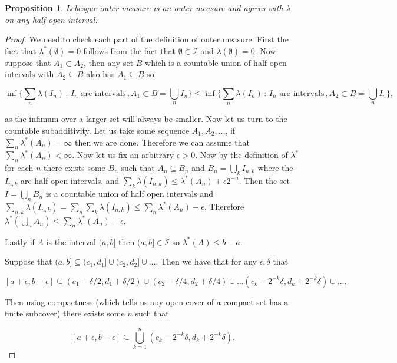\documentclass[
]{book}
\newtheorem{proposition}{Proposition}[chapter]
\theoremstyle{definition}
\theoremstyle{definition}
\theoremstyle{definition}
\theoremstyle{definition}
\theoremstyle{remark}
\begin{document}
\begin{proposition}
Lebesgue outer measure is an outer measure and agrees with \(\lambda\) on any half open interval.
\end{proposition}

\begin{proof}
We need to check each part of the definition of outer measure. First the fact that \(\lambda^*(\emptyset) = 0\) follows from the fact that \(\emptyset \in \mathcal{I}\) and \(\lambda(\emptyset) = 0\). Now suppose that \(A_1 \subset A_2\), then any set \(B\) which is a countable union of half open intervals with \(A_2 \subseteq B\) also has \(A_1 \subseteq B\) so

\[ \inf \{ \sum_n\lambda (I_n) \, : \, \mbox{$I_n$ are intervals}\,, A_1 \subset B = \bigcup_n I_n\} \leq \inf \{ \sum_n\lambda (I_n) \, : \, \mbox{$I_n$ are intervals}\,, A_2 \subset B = \bigcup_n I_n\}, \]

as the infimum over a larger set will always be smaller. Now let us turn to the countable subadditivity. Let us take some sequence \(A_1, A_2, \dots\), if \(\sum_n \lambda^*(A_n) = \infty\) then we are done. Therefore we can assume that \(\sum_n \lambda^*(A_n) < \infty\). Now let us fix an arbitrary \(\epsilon>0\). Now by the definition of \(\lambda^*\) for each \(n\) there exists some \(B_n\) such that \(A_n \subseteq B_n\) and \(B_n = \bigcup_k I_{n,k}\) where the \(I_{n,k}\) are half open intervals, and \(\sum_k\lambda(I_{n,k}) \leq \lambda^* (A_n) + \epsilon 2^{-n}\). Then the set \(I = \bigcup_n B_n\) is a countable union of half open intervals and \(\sum_{n,k}\lambda(I_{n,k}) = \sum_n \sum_k\lambda(I_{n,k}) \leq \sum_n \lambda^*(A_n) + \epsilon\). Therefore \(\lambda^*(\bigcup_n A_n) \leq \sum_n \lambda^*(A_n) + \epsilon\).

Lastly if \(A\) is the interval \((a,b]\) then \((a,b] \in \mathcal{I}\) so \(\lambda^*(A) \leq b-a\).

Suppose that \((a,b] \subseteq (c_1,d_1] \cup (c_2, d_2] \cup \dots\). Then we have that for any \(\epsilon, \delta\) that

\[ [a+\epsilon, b-\epsilon] \subseteq (c_1-\delta/2, d_1 + \delta/2) \cup (c_2 - \delta/4, d_2 + \delta/4) \cup \dots (c_k -2^{-k} \delta, d_k + 2^{-k} \delta) \cup \dots.  \]

Then using compactness (which tells us any open cover of a compact set has a finite subcover) there exists some \(n\) such that

\[ [a+\epsilon, b-\epsilon] \subseteq \bigcup_{k=1}^n (c_k -2^{-k}\delta, d_k + 2^{-k} \delta). \]


\end{proof}
\end{document}
